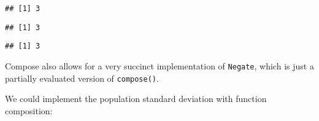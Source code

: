\begin{Shaded}
\begin{Highlighting}[]
\NormalTok{(} \OperatorTok{+}\StringTok{ }\NormalTok{)}
\end{Highlighting}
\end{Shaded}

\begin{verbatim}
## [1] 3
\end{verbatim}

\begin{Shaded}
\begin{Highlighting}[]
\DataTypeTok{+}\NormalTok{)(}\NormalTok{, }\NormalTok{)}
\end{Highlighting}
\end{Shaded}

\begin{verbatim}
## [1] 3
\end{verbatim}

\begin{Shaded}
\end{Shaded}

\begin{verbatim}
## [1] 3
\end{verbatim}

Compose also allows for a very succinct implementation of
\texttt{Negate}, which is just a partially evaluated version of
\texttt{compose()}. 

\begin{Shaded}
\begin{Highlighting}[]
\StringTok{ }\DataTypeTok{!}\NormalTok{)}
\end{Highlighting}
\end{Shaded}

We could implement the population standard deviation with function
composition:

\begin{Shaded}
\end{Shaded}

